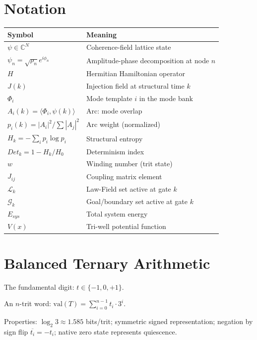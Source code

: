 \documentclass[11pt, a4paper]{report}
\begin{document}
\section{Notation}

\begin{center}
\begin{tabular}{@{}ll@{}}
\toprule
\textbf{Symbol} & \textbf{Meaning} \\
\midrule
$\psi \in \mathbb{C}^N$ & Coherence-field lattice state \\
$\psi_n = \sqrt{\rho_n} e^{i\phi_n}$ & Amplitude-phase decomposition at node $n$ \\
$H$ & Hermitian Hamiltonian operator \\
$J(k)$ & Injection field at structural time $k$ \\
$\Phi_i$ & Mode template $i$ in the mode bank \\
$A_i(k) = \langle \Phi_i, \psi(k) \rangle$ & Arc: mode overlap \\
$p_i(k) = |A_i|^2 / \sum |A_j|^2$ & Arc weight (normalized) \\
$H_k = -\sum_i p_i \log p_i$ & Structural entropy \\
$Det_k = 1 - H_k/H_0$ & Determinism index \\
$w$ & Winding number (trit state) \\
$J_{ij}$ & Coupling matrix element \\
$\mathcal{L}_k$ & Law-Field set active at gate $k$ \\
$\mathcal{G}_k$ & Goal/boundary set active at gate $k$ \\
$E_{sys}$ & Total system energy \\
$V(x)$ & Tri-well potential function \\
\bottomrule
\end{tabular}
\end{center}

\section{Balanced Ternary Arithmetic}

The fundamental digit: $t \in \{-1, 0, +1\}$.

An $n$-trit word: $\text{val}(T) = \sum_{i=0}^{n-1} t_i \cdot 3^i$.

Properties: $\log_2 3 \approx 1.585$ bits/trit; symmetric signed
representation; negation by sign flip $\overline{t_i} = -t_i$; native
zero state represents quiescence.
\end{document}
